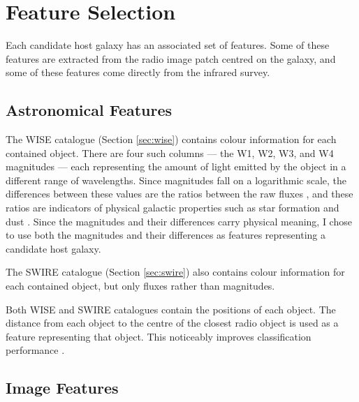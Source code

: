 
\section{Feature Selection}
\label{sec:features}

  Each candidate host galaxy has an associated set of features. Some of these features are extracted from the radio image patch centred on the galaxy, and some of these features come directly from the infrared survey.

  \subsection{Astronomical Features}
  \label{sec:astro-features}

    The WISE catalogue (Section \ref{sec:wise}) contains colour information for each contained object. There are four such columns --- the W1, W2, W3, and W4 magnitudes --- each representing the amount of light emitted by the object in a different range of wavelengths. Since magnitudes fall on a logarithmic scale, the differences between these values are the ratios between the raw fluxes , and these ratios are indicators of physical galactic properties such as star formation and dust . Since the magnitudes and their differences carry physical meaning, I chose to use both the magnitudes and their differences as features representing a candidate host galaxy.

    The SWIRE catalogue (Section \ref{sec:swire}) also contains colour information for each contained object, but only fluxes rather than magnitudes. 

    Both WISE and SWIRE catalogues contain the positions of each object. The distance from each object to the centre of the closest radio object is used as a feature representing that object. This noticeably improves classification performance .

  \subsection{Image Features}
  \label{sec:image-features}

